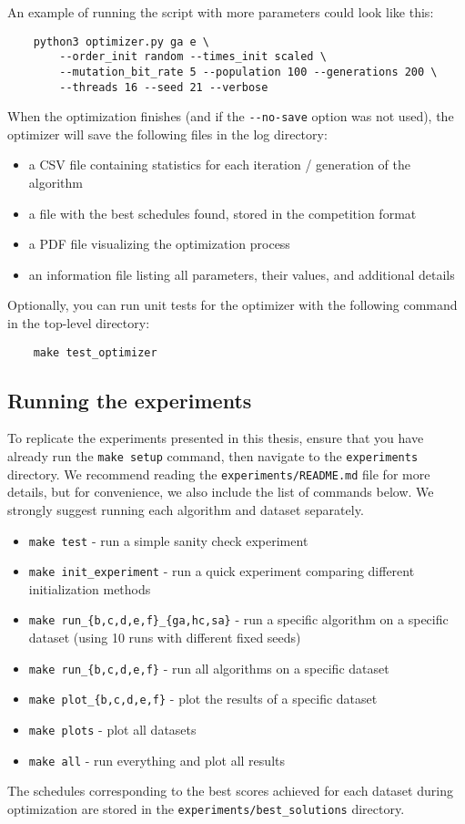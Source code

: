 An example of running the script with more parameters could look like this:
\begin{verbatim}
    python3 optimizer.py ga e \
        --order_init random --times_init scaled \
        --mutation_bit_rate 5 --population 100 --generations 200 \
        --threads 16 --seed 21 --verbose
\end{verbatim}
When the optimization finishes (and if the \verb|--no-save| option was not used), the optimizer will save the following files in the log directory:
\begin{itemize}
    \item a CSV file containing statistics for each iteration / generation of the algorithm
    \item a file with the best schedules found, stored in the competition format
    \item a PDF file visualizing the optimization process
    \item an information file listing all parameters, their values, and additional details
\end{itemize}

\bigskip

Optionally, you can run unit tests for the optimizer with the following command in the top-level directory:
\begin{verbatim}
    make test_optimizer
\end{verbatim}

\subsection{Running the experiments}

To replicate the experiments presented in this thesis, ensure that you have already run the \verb|make setup| command, then navigate to the \verb|experiments| directory. We recommend reading the \verb|experiments/README.md| file for more details, but for convenience, we also include the list of commands below. We strongly suggest running each algorithm and dataset separately.
\begin{itemize}
    \item \verb|make test| - run a simple sanity check experiment
    \item \verb|make init_experiment| - run a quick experiment comparing different initialization methods
    \item \verb|make run_{b,c,d,e,f}_{ga,hc,sa}| - run a specific algorithm on a specific dataset (using 10 runs with different fixed seeds)
    \item \verb|make run_{b,c,d,e,f}| - run all algorithms on a specific dataset
    \item \verb|make plot_{b,c,d,e,f}| - plot the results of a specific dataset
    \item \verb|make plots| - plot all datasets
    \item \verb|make all| - run everything and plot all results
\end{itemize}

The schedules corresponding to the best scores
achieved for each dataset during optimization are stored in the \verb|experiments/best_solutions| directory.
